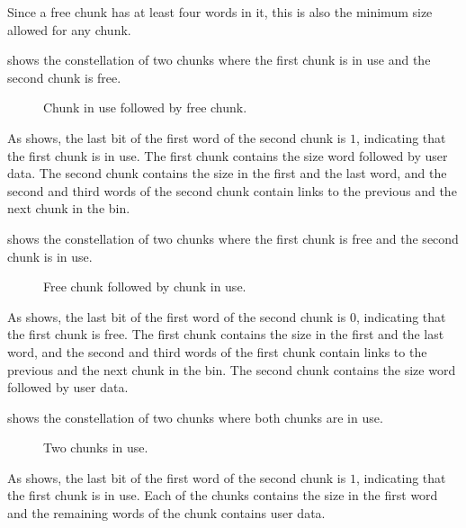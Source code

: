 Since a free chunk has at least four words in it, this is also the
minimum size allowed for any chunk.

 shows the constellation of two chunks where the
first chunk is in use and the second chunk is free.

\begin{figure}
\begin{center}
\end{center}
\caption{\label{fig-chunks2}
Chunk in use followed by free chunk.}
\end{figure}

As  shows, the last bit of the first word of the
second chunk is $1$, indicating that the first chunk is in use.  The
first chunk contains the size word followed by user data.  The second
chunk contains the size in the first and the last word, and the second
and third words of the second chunk contain links to the previous and
the next chunk in the bin.

 shows the constellation of two chunks where the
first chunk is free and the second chunk is in use.

\begin{figure}
\begin{center}
\end{center}
\caption{\label{fig-chunks3}
Free chunk followed by chunk in use.}
\end{figure}

As  shows, the last bit of the first word of the
second chunk is $0$, indicating that the first chunk is free.  The
first chunk contains the size in the first and the last word, and the
second and third words of the first chunk contain links to the
previous and the next chunk in the bin.  The second chunk contains the
size word followed by user data.

 shows the constellation of two chunks where both
chunks are in use.

\begin{figure}
\begin{center}
\end{center}
\caption{\label{fig-chunks4}
Two chunks in use.}
\end{figure}

As  shows, the last bit of the first word of the
second chunk is $1$, indicating that the first chunk is in use.  Each
of the chunks contains the size in the first word and the remaining
words of the chunk contains user data.

